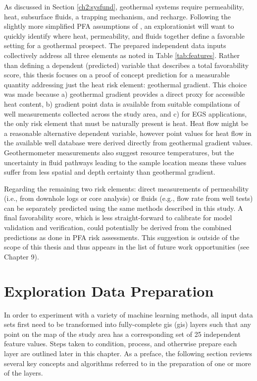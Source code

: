 As discussed in Section \ref{ch2:sysfund}, geothermal systems require permeability, heat, subsurface fluids, a trapping mechanism, and recharge. Following the slightly more simplified PFA assumptions of \citet{bielicki_hydrogeolgic_2015}, an explorationist will want to quickly identify where heat, permeability, and fluids together define a favorable setting for a geothermal prospect. The prepared independent data inputs collectively address all three elements as noted in Table \ref{tab:features}. Rather than defining a dependent (predicted) variable that describes a total favorability score, this thesis focuses on a proof of concept prediction for a measurable quantity addressing just the heat risk element: geothermal gradient. This choice was made because a) geothermal gradient provides a direct proxy for accessible heat content, b) gradient point data is available from suitable compilations of well measurements collected across the study area, and c) for EGS applications, the only risk element that must be naturally present is heat. Heat flow might be a reasonable alternative dependent variable, however point values for heat flow in the available well database were derived directly from geothermal gradient values. Geothermometer measurements also suggest resource temperatures, but the uncertainty in fluid pathways leading to the sample location means these values suffer from less spatial and depth certainty than geothermal gradient.

Regarding the remaining two risk elements: direct measurements of permeability (i.e., from downhole logs or core analysis) or fluids (e.g., flow rate from well tests) can be separately predicted using the same methods described in this study. A final favorability score, which is less straight-forward to calibrate for model validation and verification, could potentially be derived from the combined predictions as done in PFA risk assessments. This suggestion is outside of the scope of this thesis and thus appears in the list of future work opportunities (see Chapter 9).

\section{Exploration Data Preparation}

In order to experiment with a variety of machine learning methods, all input data sets first need to be transformed into fully-complete \acrlong{gis} (\acrshort{gis}) layers such that any point on the map of the study area has a corresponding set of 25 independent feature values. Steps taken to condition, process, and otherwise prepare each layer are outlined later in this chapter. As a preface, the following section reviews several key concepts and algorithms referred to in the preparation of one or more of the layers.

